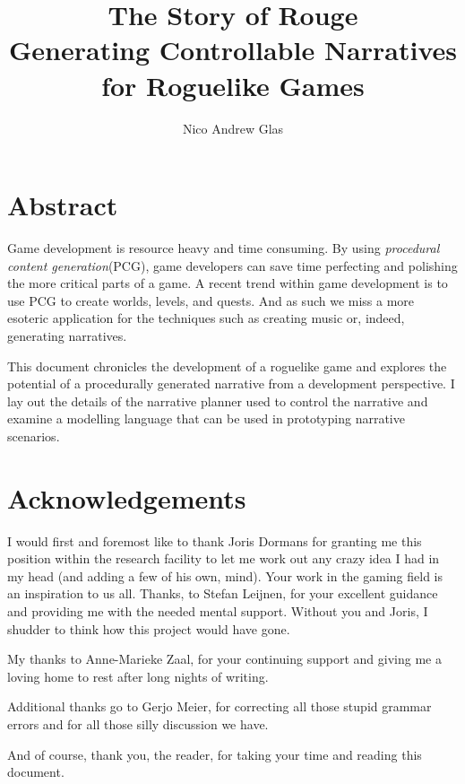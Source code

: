 \documentclass[12pt,a4paper,onecolumn,titlepage]{book}
\author{Nico Andrew Glas}
\title{The Story of Rouge\\ \small Generating Controllable Narratives for Roguelike Games}
\begin{document}
\maketitle
\chapter*{Abstract}
Game development is resource heavy and time consuming. 
By using \textit{procedural content generation}(PCG), game developers can save time perfecting and polishing the more critical parts of a game.
A recent trend within game development is to use PCG to create worlds, levels, and quests. And as such we miss a more esoteric application for the techniques such as creating music or, indeed, generating narratives.

This document chronicles the development of a roguelike game and explores the potential of a procedurally generated narrative from a development perspective.
I lay out the details of the narrative planner used to control the narrative and examine a modelling language that can be used in prototyping narrative scenarios.

\chapter*{Acknowledgements}
I would first and foremost like to thank Joris Dormans for granting me this position within the research facility to let me work out any crazy idea I had in my head (and adding a few of his own, mind). 
Your work in the gaming field is an inspiration to us all.
Thanks, to Stefan Leijnen, for your excellent guidance and providing me with the needed mental support.
Without you and Joris, I shudder to think how this project would have gone.

My thanks to Anne-Marieke Zaal, for your continuing support and giving me a loving home to rest after long nights of writing.

Additional thanks go to Gerjo Meier, for correcting all those stupid grammar errors and for all those silly discussion we have.

And of course, thank you, the reader, for taking your time and reading this document.

\tableofcontents









\end{document}
